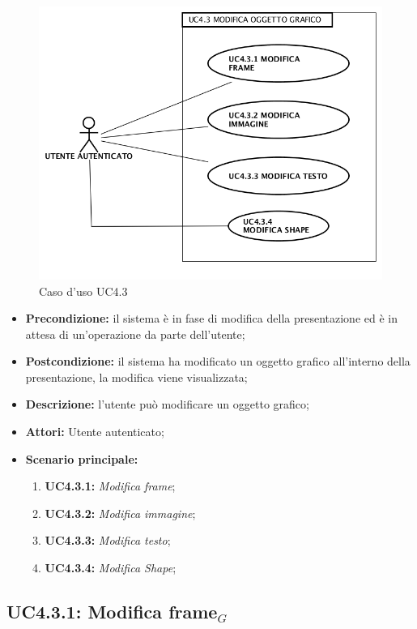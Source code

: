 \begin{figure}[H]
	\begin{center}
	\includegraphics[scale=0.4]{diagram/UC4-3.png}
	\caption{Caso d'uso UC4.3}
	\end{center}
\end{figure}
\begin{itemize}
	\item \textbf{Precondizione:} il sistema è in fase di modifica della presentazione ed è in attesa di un'operazione da parte dell'utente;
	\item \textbf{Postcondizione:} il sistema ha modificato un oggetto grafico all'interno della presentazione, la modifica viene visualizzata;
	\item \textbf{Descrizione:} l'utente può modificare un oggetto grafico;
	\item \textbf{Attori:} Utente autenticato;
	\item \textbf{Scenario principale:}
	\begin{enumerate}
		\item \textbf{ UC4.3.1:} \textit{ Modifica frame};
		\item \textbf{ UC4.3.2:} \textit{ Modifica immagine};
		\item \textbf{ UC4.3.3:} \textit{ Modifica testo};
		\item \textbf{ UC4.3.4:} \textit{ Modifica Shape};
	\end{enumerate}
\end{itemize}
\subsection{ UC4.3.1: Modifica frame$_G$}

